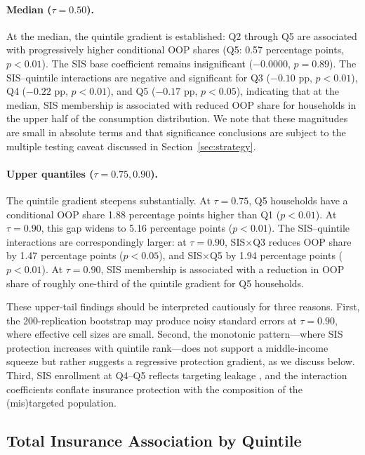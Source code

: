 \paragraph{Median ($\tau = 0.50$).} At the median, the quintile gradient is established: Q2 through Q5 are associated with progressively higher conditional OOP shares (Q5: 0.57 percentage points, $p < 0.01$). The SIS base coefficient remains insignificant ($-0.0000$, $p = 0.89$). The SIS--quintile interactions are negative and significant for Q3 ($-0.10$ pp, $p < 0.01$), Q4 ($-0.22$ pp, $p < 0.01$), and Q5 ($-0.17$ pp, $p < 0.05$), indicating that at the median, SIS membership is associated with reduced OOP share for households in the upper half of the consumption distribution. We note that these magnitudes are small in absolute terms and that significance conclusions are subject to the multiple testing caveat discussed in Section~\ref{sec:strategy}.

\paragraph{Upper quantiles ($\tau = 0.75, 0.90$).} The quintile gradient steepens substantially. At $\tau = 0.75$, Q5 households have a conditional OOP share 1.88 percentage points higher than Q1 ($p < 0.01$). At $\tau = 0.90$, this gap widens to 5.16 percentage points ($p < 0.01$). The SIS--quintile interactions are correspondingly larger: at $\tau = 0.90$, SIS$\times$Q3 reduces OOP share by 1.47 percentage points ($p < 0.05$), and SIS$\times$Q5 by 1.94 percentage points ($p < 0.01$). At $\tau = 0.90$, SIS membership is associated with a reduction in OOP share of roughly one-third of the quintile gradient for Q5 households.

These upper-tail findings should be interpreted cautiously for three reasons. First, the 200-replication bootstrap may produce noisy standard errors at $\tau = 0.90$, where effective cell sizes are small. Second, the monotonic pattern---where SIS protection increases with quintile rank---does not support a middle-income squeeze but rather suggests a regressive protection gradient, as we discuss below. Third, SIS enrollment at Q4--Q5 reflects targeting leakage \citep{Cortez2008}, and the interaction coefficients conflate insurance protection with the composition of the (mis)targeted population.

\subsection{Total Insurance Association by Quintile}

